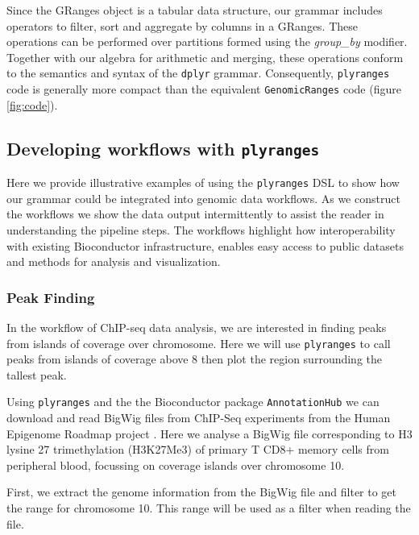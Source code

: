 \documentclass[]{article}
\begin{document}
Since the GRanges object is a tabular data structure, our grammar
includes operators to filter, sort and aggregate by columns in a
GRanges. These operations can be performed over partitions formed using
the \emph{group\_by} modifier. Together with our algebra for arithmetic
and merging, these operations conform to the semantics and syntax of the
\texttt{dplyr} grammar. Consequently, \texttt{plyranges} code is
generally more compact than the equivalent \texttt{GenomicRanges} code
(figure \ref{fig:code}).

\hypertarget{developing-workflows-with-plyranges}{%
\subsection{\texorpdfstring{Developing workflows with
\texttt{plyranges}}{Developing workflows with plyranges}}\label{developing-workflows-with-plyranges}}

Here we provide illustrative examples of using the \texttt{plyranges}
DSL to show how our grammar could be integrated into genomic data
workflows. As we construct the workflows we show the data output
intermittently to assist the reader in understanding the pipeline steps.
The workflows highlight how interoperability with existing Bioconductor
infrastructure, enables easy access to public datasets and methods for
analysis and visualization.

\hypertarget{peak-finding}{%
\subsubsection{Peak Finding}\label{peak-finding}}

In the workflow of ChIP-seq data analysis, we are interested in finding
peaks from islands of coverage over chromosome. Here we will use
\texttt{plyranges} to call peaks from islands of coverage above 8 then
plot the region surrounding the tallest peak.

Using \texttt{plyranges} and the the Bioconductor package
\texttt{AnnotationHub} \cite{R-ahub} we can download and read BigWig
files from ChIP-Seq experiments from the Human Epigenome Roadmap project
\cite{Roadmap-Epigenomics-Consortium2015-pr}. Here we analyse a BigWig
file corresponding to H3 lysine 27 trimethylation (H3K27Me3) of primary
T CD8+ memory cells from peripheral blood, focussing on coverage islands
over chromosome 10.

First, we extract the genome information from the BigWig file and filter
to get the range for chromosome 10. This range will be used as a filter
when reading the file.
\end{document}
